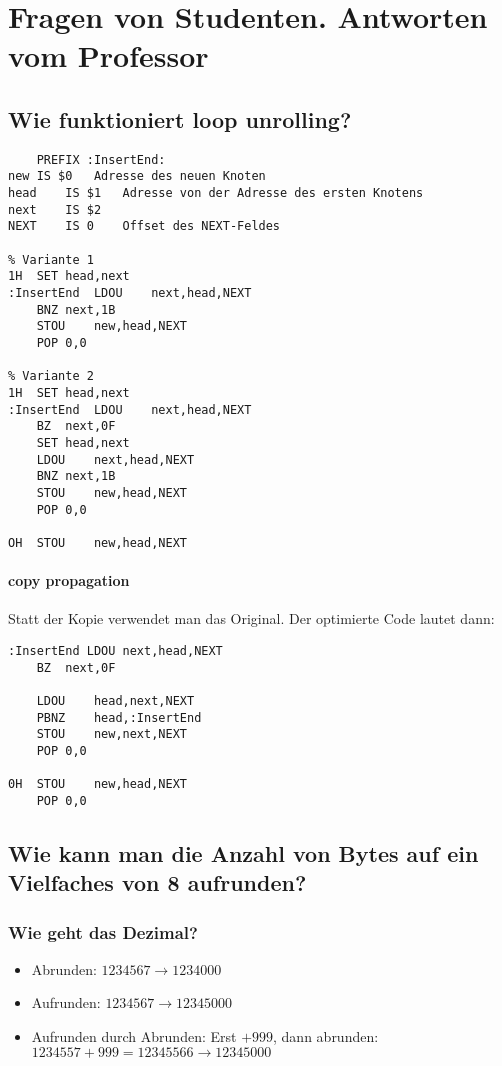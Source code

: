 \renewcommand{\ldate}{2015-06-17}	%
\fancyfoot[R]{\tiny{SS 2015 / \ldate}}

\section{Fragen von Studenten. Antworten vom Professor}

\subsection{Wie funktioniert loop unrolling?}

\begin{lstlisting}
	PREFIX :InsertEnd:
new	IS $0	Adresse des neuen Knoten
head	IS $1	Adresse von der Adresse des ersten Knotens
next	IS $2
NEXT	IS 0	Offset des NEXT-Feldes

% Variante 1
1H	SET head,next
:InsertEnd	LDOU	next,head,NEXT
	BNZ	next,1B
	STOU	new,head,NEXT
	POP	0,0
	
% Variante 2	
1H	SET head,next
:InsertEnd	LDOU	next,head,NEXT
	BZ	next,0F
	SET	head,next
	LDOU	next,head,NEXT
	BNZ	next,1B
	STOU	new,head,NEXT
	POP	0,0
	
OH	STOU	new,head,NEXT	
\end{lstlisting}


\paragraph{copy propagation} Statt der Kopie verwendet man das Original. Der optimierte Code lautet dann:

\begin{lstlisting}
:InsertEnd LDOU	next,head,NEXT
	BZ	next,0F

	LDOU	head,next,NEXT
	PBNZ	head,:InsertEnd
	STOU	new,next,NEXT
	POP	0,0
	
0H	STOU	new,head,NEXT
	POP	0,0	
\end{lstlisting} 

\subsection{Wie kann man die Anzahl von Bytes auf ein Vielfaches von 8 aufrunden?}

\subsubsection{Wie geht das Dezimal?}
\begin{itemize}
\item Abrunden: $1234567 \rightarrow 1234000$
\item Aufrunden: $1234567 \rightarrow 12345000$
\item Aufrunden durch Abrunden: Erst $+999$, dann abrunden: $1234557 + 999 = 12345566 \rightarrow 12345000$
\end{itemize}

